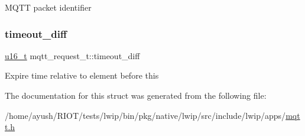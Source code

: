 M\+Q\+TT packet identifier \mbox{\label{structmqtt__request__t_a65a7292669bc1f2d9df8f30bbcd77073}} 
\subsubsection{\texorpdfstring{timeout\+\_\+diff}{timeout\_diff}}
{\footnotesize\ttfamily \hyperlink{group__compiler__abstraction_ga77570ac4fcab86864fa1916e55676da2}{u16\+\_\+t} mqtt\+\_\+request\+\_\+t\+::timeout\+\_\+diff}

Expire time relative to element before this 

The documentation for this struct was generated from the following file\+:\begin{DoxyCompactItemize}
\item 
/home/ayush/\+R\+I\+O\+T/tests/lwip/bin/pkg/native/lwip/src/include/lwip/apps/\hyperlink{native_2lwip_2src_2include_2lwip_2apps_2mqtt_8h}{mqtt.\+h}\end{DoxyCompactItemize}
